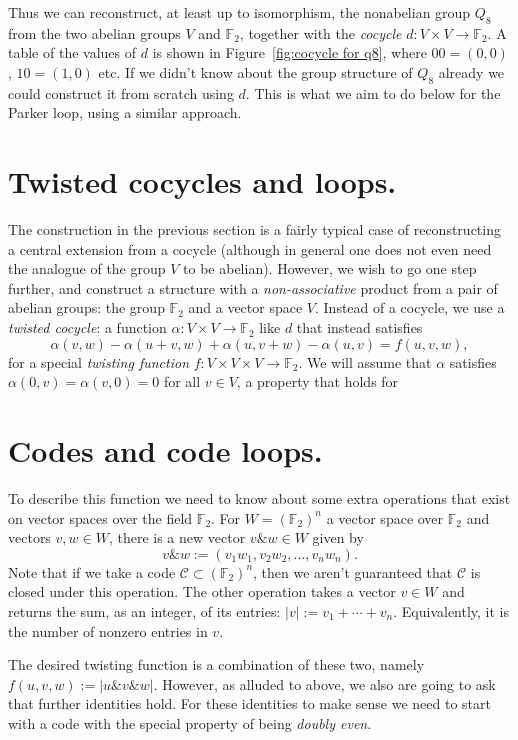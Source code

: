 \documentclass{article}
\theoremstyle{plain}
\theoremstyle{definition}
\def \cC {\mathcal{C}}
\def \FF {\mathbb{F}}
\newcommand{\AND}{\mathbin{\texttt{\&}}}
\begin{document}
Thus we can reconstruct, at least up to isomorphism, the nonabelian group $Q_8$ from the two abelian groups $V$ and $\FF_2$, together with the \emph{cocycle} $d\colon V\times V\to \FF_2$.
A table of the values of $d$ is shown in Figure~\ref{fig:cocycle for q8}, where $00=(0,0)$, $10 = (1,0)$ etc.
If we didn't know about the group structure of $Q_8$ already we could construct it from scratch using $d$.
This is what we aim to do below for the Parker loop, using a similar approach.


\section{Twisted cocycles and loops.}

The construction in the previous section is a fairly typical case of reconstructing a central extension from a cocycle (although in general one does not even need the analogue of the group $V$ to be abelian). 
However, we wish to go one step further, and construct a structure with a \emph{non-associative} product from a pair of abelian groups: the group $\FF_2$ and a vector space $V$.
Instead of a cocycle, we use a \emph{twisted cocycle}: a function $\alpha\colon V\times V \to \FF_2$ like $d$ that instead satisfies
\[
	\alpha(v,w)-\alpha(u+v,w)+\alpha(u,v+w)-\alpha(u,v) = f(u,v,w),
\]
for a special \emph{twisting function} $f\colon V\times V\times V \to \FF_2$. We will assume that $\alpha$ satisfies $\alpha(0,v)=\alpha(v,0) = 0$ for all $v\in V$, a property that holds for 





\section{Codes and code loops.}

To describe this function we need to know about some extra operations that exist on vector spaces over the field $\FF_2$. 
For $W=(\FF_2)^n$ a vector space over $\FF_2$ and vectors $v,w\in W$, there is a new vector $v\AND w \in W$ given by
\[
	v\AND w := (v_1w_1,v_2w_2,\ldots,v_nw_n).
\]
Note that if we take a code $\cC \subset (\FF_2)^n$, then we aren't guaranteed that $\cC$ is closed under this operation.
The other operation takes a vector $v\in W$ and returns the sum, as an integer, of its entries: $|v| := v_1 + \cdots + v_n$. Equivalently, it is the number of nonzero entries in $v$.

The desired twisting function is a combination of these two, namely $f(u,v,w) := |u\AND v\AND w|$.
However, as alluded to above, we also are going to ask that further identities hold. 
For these identities to make sense we need to start with a code with the special property of being \emph{doubly even}.
\end{document}
